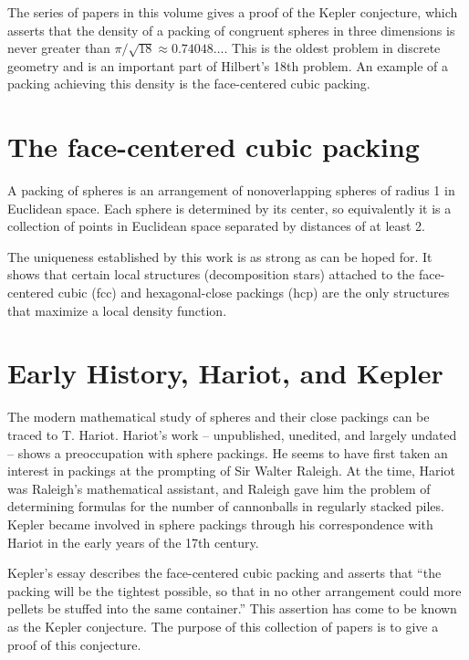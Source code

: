 




The series of papers in this volume gives a proof of the Kepler
conjecture, which asserts that the density of a packing of
congruent spheres in three dimensions is never greater than
$\pi/\sqrt{18}\approx 0.74048\ldots$. This is the oldest problem
in discrete geometry and is an important part of Hilbert's 18th
problem. An example of a packing achieving this density is the
face-centered cubic packing.


\label{sec:intro-review}

\section{The face-centered cubic packing}

A packing of spheres is an arrangement of nonoverlapping spheres
of radius 1 in Euclidean space. Each sphere is determined by its
center, so equivalently it is a collection of points in Euclidean
space separated by distances of at least 2.

The uniqueness established by this work is as strong as can be
hoped for. It shows that certain local structures (decomposition
stars) attached to the face-centered cubic (fcc) and
hexagonal-close packings (hcp) are the only structures that
maximize a local density function.


\section{Early History, Hariot, and Kepler}
\label{sec:early}



The modern mathematical study of spheres and their close packings
can be traced to T. Hariot.  Hariot's work -- unpublished,
unedited, and largely undated -- shows a preoccupation with sphere
packings. He seems to have first taken an interest in packings at
the prompting of Sir Walter Raleigh.  At the time, Hariot was
Raleigh's mathematical assistant,  and Raleigh gave him the
problem of determining formulas for the number of cannonballs in
regularly stacked piles. Kepler became involved in sphere packings
through his correspondence with Hariot in the early years of the
17th century.

Kepler's essay describes the face-centered cubic packing and
asserts that ``the packing will be the tightest possible, so that
in no other arrangement  could more pellets be stuffed into the
same container.''  This assertion has come to be known as the
Kepler conjecture.   The purpose of this collection of papers is
to give a proof of this conjecture.

